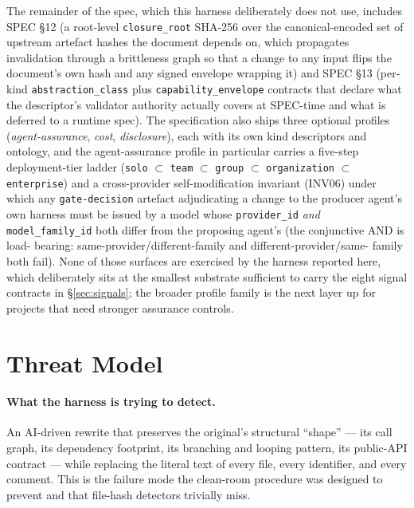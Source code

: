 \documentclass[11pt,letterpaper]{article}
\begin{document}
The remainder of the spec, which this harness deliberately does not
use, includes SPEC \S 12 (a root-level \texttt{closure\_root}
SHA-256 over the canonical-encoded set of upstream artefact hashes
the document depends on, which propagates invalidation through a
brittleness graph so that a change to any input flips the document's
own hash and any signed envelope wrapping it) and SPEC \S 13 (per-kind
\texttt{abstraction\_class} plus \texttt{capability\_envelope}
contracts that declare what the descriptor's validator authority
actually covers at SPEC-time and what is deferred to a runtime spec).
The specification also ships three optional profiles
(\emph{agent-assurance}, \emph{cost}, \emph{disclosure}), each with
its own kind descriptors and ontology, and the agent-assurance
profile in particular carries a five-step deployment-tier ladder
(\texttt{solo} $\subset$ \texttt{team} $\subset$ \texttt{group}
$\subset$ \texttt{organization} $\subset$ \texttt{enterprise}) and
a cross-provider self-modification invariant (INV06) under which any
\texttt{gate-decision} artefact adjudicating a change to the producer
agent's own harness must be issued by a model whose
\texttt{provider\_id} \emph{and} \texttt{model\_family\_id} both
differ from the proposing agent's (the conjunctive AND is load-
bearing: same-provider/different-family and different-provider/same-
family both fail). None of those surfaces are exercised by the
harness reported here, which deliberately sits at the smallest
substrate sufficient to carry the eight signal contracts in
\S \ref{sec:signals}; the broader profile family is the next
layer up for projects that need stronger assurance controls.

\section{Threat Model}
\label{sec:threat-model}

\paragraph{What the harness is trying to detect.} An AI-driven rewrite
that preserves the original's structural ``shape'' --- its call graph,
its dependency footprint, its branching and looping pattern, its
public-API contract --- while replacing the literal text of every
file, every identifier, and every comment. This is the failure mode
the clean-room procedure was designed to prevent and that file-hash
detectors trivially miss.
\end{document}
